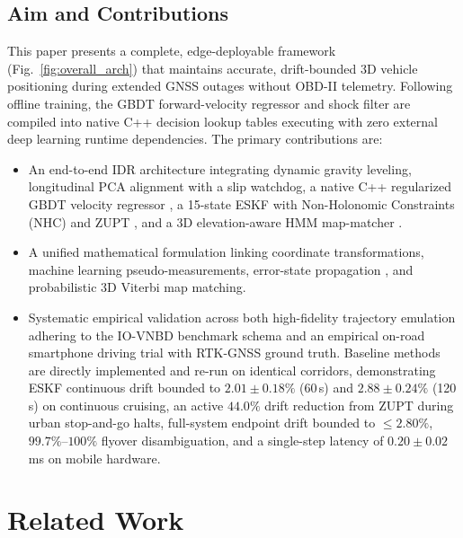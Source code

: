 \documentclass[conference]{IEEEtran}
\begin{document}
\subsection{Aim and Contributions}
This paper presents a complete, edge-deployable framework (Fig.~\ref{fig:overall_arch}) that maintains accurate, drift-bounded 3D vehicle positioning during extended GNSS outages without OBD-II telemetry. Following offline training, the GBDT forward-velocity regressor and shock filter are compiled into native C++ decision lookup tables executing with zero external deep learning runtime dependencies. The primary contributions are:
\begin{itemize}
\item An end-to-end IDR architecture integrating dynamic gravity leveling, longitudinal PCA alignment with a slip watchdog, a native C++ regularized GBDT velocity regressor \cite{friedman2001}, a 15-state ESKF with Non-Holonomic Constraints (NHC) \cite{dissanayake2001} and ZUPT \cite{foxlin2005}, and a 3D elevation-aware HMM map-matcher \cite{newson2009}.
\item A unified mathematical formulation linking coordinate transformations, machine learning pseudo-measurements, error-state propagation \cite{sola2017}, and probabilistic 3D Viterbi map matching.
\item Systematic empirical validation across both high-fidelity trajectory emulation adhering to the IO-VNBD benchmark schema \cite{onyekpe2021} and an empirical on-road smartphone driving trial with RTK-GNSS ground truth. Baseline methods \cite{dissanayake2001, brossard2020} are directly implemented and re-run on identical corridors, demonstrating ESKF continuous drift bounded to $2.01 \pm 0.18\%$ (60\,s) and $2.88 \pm 0.24\%$ (120\,s) on continuous cruising, an active $44.0\%$ drift reduction from ZUPT during urban stop-and-go halts, full-system endpoint drift bounded to $\le 2.80\%$, $99.7\%$--$100\%$ flyover disambiguation, and a single-step latency of $0.20 \pm 0.02$\,ms on mobile hardware.
\end{itemize}

\section{Related Work}
\end{document}
